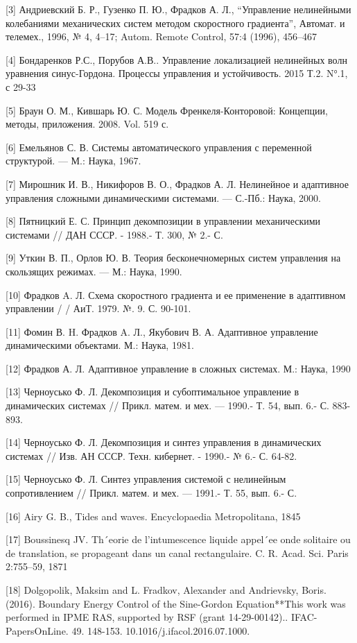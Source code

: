 [3] Андриевский Б. Р., Гузенко П. Ю., Фрадков А. Л., “Управление нелинейными колебаниями механических систем методом скоростного градиента”, Автомат. и телемех., 1996, № 4, 4–17; Autom. Remote Control, 57:4 (1996), 456–467

[4] Бондаренков Р.С., Порубов А.В.. Управление локализацией нелинейных волн уравнения синус-Гордона. Процессы управления и устойчивость. 2015 Т.2. N°.1, с 29-33

[5] Браун О. М., Кившарь Ю. С. Модель Френкеля-Конторовой: Концепции, методы, приложения. 2008. Vol. 519 с.

[6]	Емельянов С. В. Системы автоматического управления с переменной структурой. — М.: Наука, 1967.

[7]	Мирошник И. В., Никифоров В. О., Фрадков А. Л. Нелинейное и адаптивное управления сложными динамическими системами. — С.-Пб.: Наука, 2000.

[8]	Пятницкий Е. С. Принцип декомпозиции в управлении механическими системами // ДАН СССР. - 1988.- Т. 300, № 2.- С.

[9]	Уткин В. П., Орлов Ю. В. Теория бесконечномерных систем управления на скользящих режимах. — М.: Наука, 1990.

[10] Фрадков A. Л. Схема скоростного градиента и ее применение в адаптивном управлении / / АиТ. 1979. №. 9. С. 90-101.

[11] Фомин В. H. Фрадков A. Л., Якубович В. А. Адаптивное управление динамическими объектами. М.: Наука, 1981.

[12] Фрадков А. Л. Адаптивное управление в сложных системах. М.: Наука, 1990

[13] Черноусько Ф. Л. Декомпозиция и субоптимальное управление в динамических системах // Прикл. матем. и мех. — 1990.- Т. 54, вып. 6.- С. 883- 893.

[14] Черноусько Ф. Л. Декомпозиция и синтез управления в динамических системах // Изв. АН СССР. Техн. кибернет. - 1990.- № 6.- С. 64-82.

[15] Черноусько Ф. Л. Синтез управления системой с нелинейным сопротивлением // Прикл. матем. и мех. — 1991.- Т. 55, вып. 6.- С.

[16] Airy G. B., Tides and waves. Encyclopaedia Metropolitana, 1845

[17] Boussinesq JV. Th´eorie de l’intumescence liquide appel´ee onde solitaire ou de translation, se propageant dans un canal rectangulaire. C. R. Acad. Sci. Paris 2:755–59, 1871

[18] Dolgopolik, Maksim and L. Fradkov, Alexander and Andrievsky, Boris. (2016). Boundary Energy Control of the Sine-Gordon Equation**This work was performed in IPME RAS, supported by RSF (grant 14-29-00142).. IFAC-PapersOnLine. 49. 148-153. 10.1016/j.ifacol.2016.07.1000.

